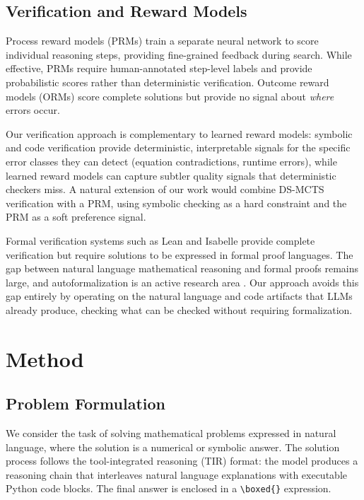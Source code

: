 \documentclass[11pt,a4paper]{article}
\begin{document}
\subsection{Verification and Reward Models}

Process reward models (PRMs) \citep{lightman2023lets} train a separate neural
network to score individual reasoning steps, providing fine-grained feedback
during search. While effective, PRMs require human-annotated step-level labels
and provide probabilistic scores rather than deterministic verification. Outcome
reward models (ORMs) score complete solutions but provide no signal about
\emph{where} errors occur.

Our verification approach is complementary to learned reward models: symbolic
and code verification provide deterministic, interpretable signals for the
specific error classes they can detect (equation contradictions, runtime
errors), while learned reward models can capture subtler quality signals that
deterministic checkers miss. A natural extension of our work would combine
DS-MCTS verification with a PRM, using symbolic checking as a hard constraint
and the PRM as a soft preference signal.

Formal verification systems such as Lean \citep{demoura2021lean4} and Isabelle
\citep{paulson1994isabelle} provide complete verification but require solutions
to be expressed in formal proof languages. The gap between natural language
mathematical reasoning and formal proofs remains large, and autoformalization
is an active research area \citep{wu2022autoformalization}. Our approach avoids
this gap entirely by operating on the natural language and code artifacts that
LLMs already produce, checking what can be checked without requiring
formalization.


\section{Method}
\label{sec:method}

\subsection{Problem Formulation}

We consider the task of solving mathematical problems expressed in natural
language, where the solution is a numerical or symbolic answer. The solution
process follows the tool-integrated reasoning (TIR) format: the model produces
a reasoning chain that interleaves natural language explanations with executable
Python code blocks. The final answer is enclosed in a \verb|\boxed{}| expression.
\end{document}
